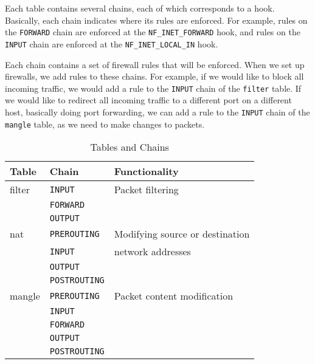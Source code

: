 Each table contains several chains, each of which corresponds to a \netfilter hook. Basically,
each chain indicates where its rules are enforced. For example, rules on
the \texttt{FORWARD} chain are enforced at the \texttt{NF\_INET\_FORWARD} hook, and rules on
the \texttt{INPUT} chain are enforced at the  \texttt{NF\_INET\_LOCAL\_IN} hook.

Each chain contains a set of firewall rules that will be enforced.
When we set up firewalls, we add rules to these chains.
For example, if we would like to block all incoming \telnet traffic, we would
add a rule to the \texttt{INPUT} chain of the \texttt{filter} table.  If we
would like to redirect all incoming \telnet traffic to a different
port on a different host, basically doing port forwarding, we can add a rule to the
\texttt{INPUT} chain of the \texttt{mangle} table, as we need to make changes to packets.


\begin{table}[htb]
        \centering
        \caption{\iptables Tables and Chains}
        \label{firewall:table:iptables}
        \centering

        \begin{tabular}{|l|l|l|}
                \hline
                \bfseries Table & \bfseries Chain & \bfseries Functionality \\
                \hline\hline
                filter          &    \texttt{INPUT}      & Packet filtering \\
                                &    \texttt{FORWARD}    & \\
                                &    \texttt{OUTPUT}      & \\
                \hline
                nat             &   \texttt{PREROUTING}    & Modifying source or destination \\
                                &   \texttt{INPUT}      & network addresses \\
                                &   \texttt{OUTPUT}      & \\
                                &   \texttt{POSTROUTING}   & \\
                \hline
                mangle          &   \texttt{PREROUTING}    & Packet content modification \\
                                &   \texttt{INPUT}      & \\
                                &   \texttt{FORWARD}     & \\
                                &   \texttt{OUTPUT}      & \\
                                &   \texttt{POSTROUTING}   & \\
                \hline
        \end{tabular}
\end{table}


